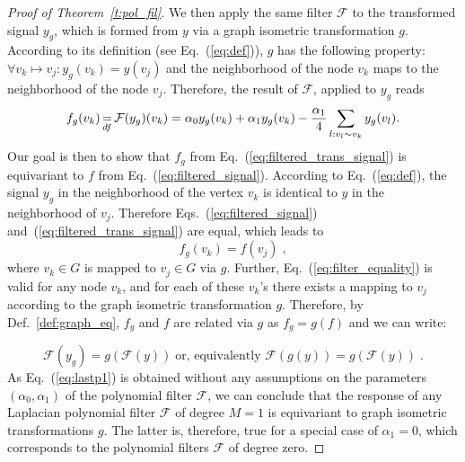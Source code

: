 \documentclass[10pt,journal,compsoc]{IEEEtran}
\newcommand{\df}{\mathop{=}\limits_{df}}
\begin{document}
\begin{proof}[Proof of Theorem~\ref{t:pol_fil}]
		We then apply the same filter $\mathcal{F}$ to the transformed signal $y_g$, which is formed from $y$ via a graph isometric transformation $g$. According to its definition (see Eq.~(\ref{eq:def})), $g$ has the following property: $\forall v_k \mapsto v_j : y_g(v_k) = y(v_j)$ and the neighborhood of the node $v_k$ maps to the neighborhood of the node $v_j$. %
		Therefore, the result of $\mathcal{F}$, applied to $y_g$ reads
		\begin{equation}
		\small
		f_g(v_k) \df \mathcal{F}(y_g)(v_k) = \alpha_0 y_g(v_k) + \alpha_1 y_g(v_k) - \frac{\alpha_1}{4} \sum\limits_{l: v_l \sim v_k} y_g(v_l).
		\label{eq:filtered_trans_signal}
		\end{equation}
		Our goal is then to show that $f_g$ from Eq.~(\ref{eq:filtered_trans_signal}) is equivariant to $f$ from Eq.~(\ref{eq:filtered_signal}).
		According to Eq.~(\ref{eq:def}), the signal $y_g$ in the neighborhood of the vertex $v_k$ is identical to $y$ in the neighborhood of $v_j$. Therefore Eqs.~(\ref{eq:filtered_signal}) and~(\ref{eq:filtered_trans_signal}) are equal, which leads to
		\begin{equation}
		f_g(v_k) = f(v_j)\;,
		\label{eq:filter_equality}
		\end{equation}
		\noindent
		where $v_k \in G$ is mapped to $v_j \in G$ via $g$.
		Further, Eq.~(\ref{eq:filter_equality}) is valid for any node $v_k$, and for each of these $v_k$'s there exists a mapping to $v_j$ according to the graph isometric transformation $g$. Therefore, by Def.~\ref{def:graph_eq}, $f_g$ and $f$ are related via $g$ as $f_g = g(f)$ and we can write:

		\begin{equation}
		\mathcal{F}(y_g) = g \left(\mathcal{F}(y) \right)\; \text{or, equivalently }	\mathcal{F}\left(g(y) \right) = g \left(\mathcal{F}(y) \right)\; .
		\label{eq:lastp1}
		\end{equation}
		\noindent
		As Eq.~(\ref{eq:lastp1}) is obtained without any assumptions on the parameters $(\alpha_0, \alpha_1)$ of the polynomial filter $\mathcal{F}$, we can conclude that the response of any Laplacian polynomial filter $\mathcal{F}$ of degree $M=1$ is equivariant to graph isometric transformations $g$. The latter is, therefore, true for a special case of $\alpha_1 = 0$, which corresponds to the polynomial filters $\mathcal{F}$ of degree zero.


\end{proof}
\end{document}
